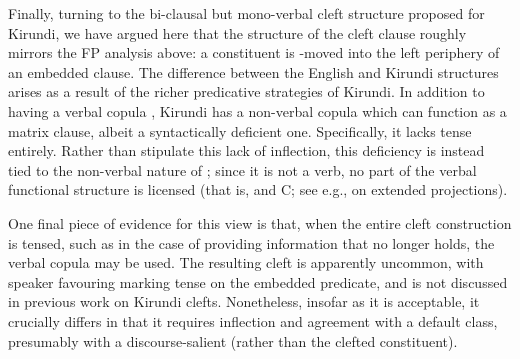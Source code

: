 \documentclass[12pt]{article}
\begin{document}
Finally, turning to the bi-clausal but mono-verbal cleft structure proposed for Kirundi, we have argued here that the structure of the cleft clause roughly mirrors the FP analysis above: a constituent is \abar{}-moved into the left periphery of an embedded clause. The difference between the English and Kirundi structures arises as a result of the richer predicative strategies of Kirundi. In addition to having a verbal copula , Kirundi has a non-verbal copula  which can function as a matrix clause, albeit a syntactically deficient one. Specifically, it lacks tense entirely. Rather than stipulate this lack of inflection, this deficiency is instead tied to the non-verbal nature of ; since it is not a verb, no part of the verbal functional structure is licensed (that is,  and C; see e.g., \citealt{grimshaw-2000} on extended projections).

\bex
\ex {}
\bxl
{} 
\ex[]{\lb{PredP} \tit{pro} ni \lb{CP} \tbf{igitabu}$_{1}$ C \lb{TP} Yohaáni yasomyé \tit{t}$_{1}$]]]}
\fxl
\fex

One final piece of evidence for this view is that, when the entire cleft construction is tensed, such as in the case of providing information that no longer holds, the verbal copula may be used. The resulting cleft is apparently uncommon, with speaker favouring marking tense on the embedded predicate, and is not discussed in previous work on Kirundi clefts. Nonetheless, insofar as it is acceptable, it crucially differs in that it requires inflection and agreement with a default class, presumably with a discourse-salient  (rather than the clefted constituent).

\bex
{} 
\fex


\end{document}
